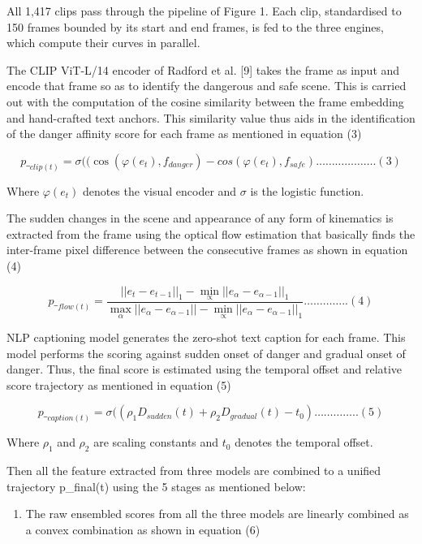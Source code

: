 All 1,417 clips pass through the pipeline of Figure 1. Each clip, standardised to 150 frames bounded by its start and end frames, is fed to the three engines, which compute their curves in parallel.

The CLIP ViT-L/14 encoder of Radford et al. {[}9{]} takes the frame as input and encode that frame so as to identify the dangerous and safe scene. This is carried out with the computation of the cosine similarity between the frame embedding and hand-crafted text anchors. This similarity value thus aids in the identification of the danger affinity score for each frame as mentioned in equation (3)

\[{p\_}_{clip(t)} = \sigma((\cos\left( \varphi\left( e_{t} \right),f_{danger} \right) - cos(\varphi\left( e_{t} \right),f_{safe})\ldots\ldots\ldots\ldots\ldots\ldots.(3)\]

Where \(\varphi\left( e_{t} \right)\) denotes the visual encoder and \(\sigma\) is the logistic function.

The sudden changes in the scene and appearance of any form of kinematics is extracted from the frame using the optical flow estimation that basically finds the inter-frame pixel difference between the consecutive frames as shown in equation (4)

\[{p\_}_{flow(t)} = \frac{{|\left| e_{t} - e_{t - 1} \right||}_{1} - \min_{\propto}{|\left| e_{\alpha} - e_{\alpha - 1} \right||}_{1}}{\max_{\alpha}{||e_{\alpha} - e_{\alpha - 1}}|| - \min_{\propto}{|\left| e_{\alpha} - e_{\alpha - 1} \right||}_{1}}\ldots\ldots\ldots\ldots..(4)\]

NLP captioning model generates the zero-shot text caption for each frame. This model performs the scoring against sudden onset of danger and gradual onset of danger. Thus, the final score is estimated using the temporal offset and relative score trajectory as mentioned in equation (5)

\[{p\_}_{caption(t)} = \sigma(\left( \rho_{1}D_{sudden}(t) + \rho_{2}D_{gradual}(t) - t_{0} \right)\ldots\ldots\ldots\ldots..(5)\]

Where \(\rho_{1}\) and \(\rho_{2}\) are scaling constants and \(t_{0}\) denotes the temporal offset.

Then all the feature extracted from three models are combined to a unified trajectory p\_final(t) using the 5 stages as mentioned below:

\begin{enumerate}
\def\labelenumi{\arabic{enumi}.}
\item
  The raw ensembled scores from all the three models are linearly combined as a convex combination as shown in equation (6)
\end{enumerate}

